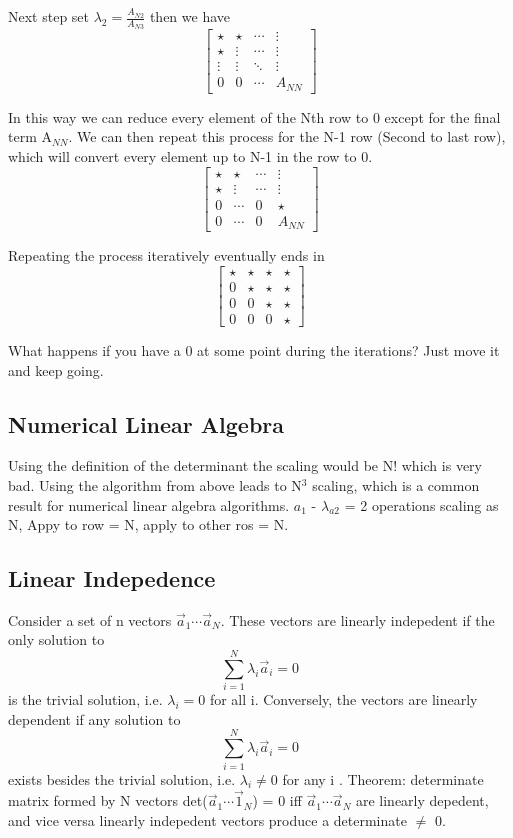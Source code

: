 \documentclass{article}
\newcommand{\be}{\begin{equation}}
\newcommand{\ee}{\end{equation}}
\begin{document}
Next step set $\lambda_2 = \frac{A_{N2}}{A_{N3}}$ then we have
\be
\begin{bmatrix}
    \star  & \star & \dotsb & \vdots \\
    \star & \vdots &\dotsb &  \vdots \\
    \vdots & \vdots &  \ddots &  \vdots \\
    0  & 0 & \dotsb &  A_{NN}
\end{bmatrix}
\ee

In this way we can reduce every element of the Nth row to 0 except for the final term A$_{NN}$.
We can then repeat this process for the N-1 row (Second to last row), which will convert every element up to N-1 in the row to 0.%
\be
\begin{bmatrix}
    \star  & \star & \dotsb & \vdots \\
    \star & \vdots &\dotsb &  \vdots \\
    0 & \dotsb &  0 &  \star \\
    0  & \dotsb & 0 &  A_{NN}
\end{bmatrix}
\ee

Repeating the process iteratively eventually ends in
\be
\begin{bmatrix}
    \star  & \star & \star & \star \\
     0 & \star &\star &  \star \\
     0 & 0 &  \star &  \star \\
    0  & 0 & 0 &  \star
\end{bmatrix}
\ee

What happens if you have a 0 at some point during the iterations? Just move it and keep going.

\subsection{Numerical Linear Algebra}
Using the definition of the determinant the scaling would be N! which is very bad.
Using the algorithm from above leads to N$^3$ scaling, which is a common result for numerical linear algebra algorithms.
$a_1$ - $\lambda_{a2}$ = 2 operations scaling as N, Appy to row = N, apply to other ros = N.

\subsection{Linear Indepedence}
Consider a set of n vectors $\vec{a}_1 \cdots \vec{a}_N$.
These vectors are linearly indepedent if the only solution to
\be
  \sum_{i=1}^N \lambda_i\vec{a}_i = 0
\ee
is the trivial solution, i.e. $\lambda_i = 0$ for all i.
Conversely, the vectors are linearly dependent if any solution to
\be
  \sum_{i=1}^N \lambda_i\vec{a}_i = 0
\ee
exists besides the trivial solution, i.e. $\lambda_i \neq 0$ for any i .
Theorem: determinate matrix formed by N vectors det($\vec{a}_1\cdots\vec{1}_N$) = 0 iff $\vec{a}_1\cdots\vec{a}_N$ are linearly depedent, and vice versa linearly indepedent vectors produce a determinate $\neq$ 0.
\end{document}
